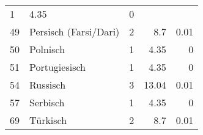 \begin{longtable}{lXrrr}
       \num{1} &
       \num[round-mode=places,round-precision=2]{4,35} &
         \num[round-mode=places,round-precision=2]{0} \\

     49 &
     \multicolumn{1}{X}{ Persisch (Farsi/Dari)   } &


       \num{2} &
       \num[round-mode=places,round-precision=2]{8,7} &
         \num[round-mode=places,round-precision=2]{0,01} \\

     50 &
     \multicolumn{1}{X}{ Polnisch   } &


       \num{1} &
       \num[round-mode=places,round-precision=2]{4,35} &
         \num[round-mode=places,round-precision=2]{0} \\

     51 &
     \multicolumn{1}{X}{ Portugiesisch   } &


       \num{1} &
       \num[round-mode=places,round-precision=2]{4,35} &
         \num[round-mode=places,round-precision=2]{0} \\

     54 &
     \multicolumn{1}{X}{ Russisch   } &


       \num{3} &
       \num[round-mode=places,round-precision=2]{13,04} &
         \num[round-mode=places,round-precision=2]{0,01} \\

     57 &
     \multicolumn{1}{X}{ Serbisch   } &


       \num{1} &
       \num[round-mode=places,round-precision=2]{4,35} &
         \num[round-mode=places,round-precision=2]{0} \\

     69 &
     \multicolumn{1}{X}{ Türkisch   } &


       \num{2} &
       \num[round-mode=places,round-precision=2]{8,7} &
         \num[round-mode=places,round-precision=2]{0,01} \\


\end{longtable}
